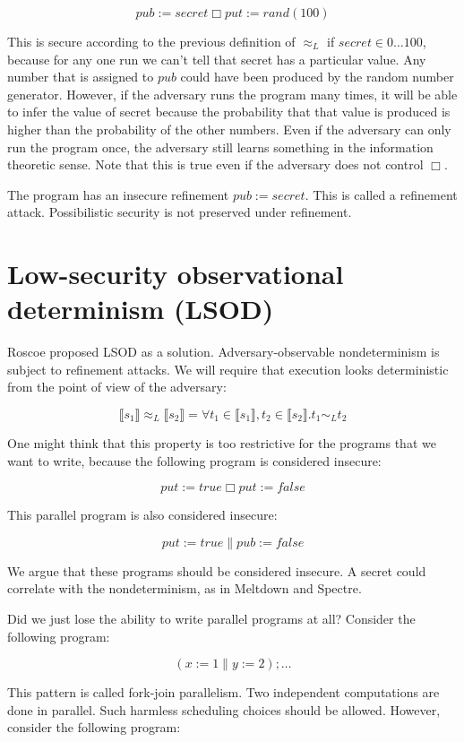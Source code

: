 \documentclass{article}
\begin{document}
\[
pub := secret \Box put := rand(100)
\]

This is secure according to the previous definition of $\approx_L$ if $secret \in {0\dots 100}$, because for any one run we can't tell that secret has a particular value. Any number that is assigned to $pub$ could have been produced by the random number generator. However, if the adversary runs the program many times, it will be able to infer the value of secret because the probability that that value is produced is higher than the probability of the other numbers. Even if the adversary can only run the program once, the adversary still learns something in the information theoretic sense. Note that this is true even if the adversary does not control $\Box$.

The program has an insecure refinement $pub :=  secret$. This is called a refinement attack. Possibilistic security is not preserved under refinement. 

\section*{Low-security observational determinism (LSOD)}

Roscoe \cite{roscoe1995csp} proposed LSOD as a solution. Adversary-observable nondeterminism is subject to refinement attacks. We will require that execution looks deterministic from the point of view of the adversary:

\[
\llbracket s_1 \rrbracket \approx_L \llbracket s_2 \rrbracket = \forall t_1 \in \llbracket s_1 \rrbracket, t_2 \in \llbracket s_2 \rrbracket. t_1 \sim_L t_2
\]

One might think that this property is too restrictive for the programs that we want to write, because the following program is considered insecure:

\[put := true \Box put := false\]

This parallel program is also considered insecure:

\[put := true \parallel pub := false\]

We argue that these programs should be considered insecure. A secret could correlate with the nondeterminism, as in Meltdown and Spectre. 

Did we just lose the ability to write parallel programs at all? Consider the following program:

\[(x := 1 \parallel y := 2); \dots\]

This pattern is called fork-join parallelism. Two independent computations are done in parallel. Such harmless scheduling choices should be allowed. However, consider the following program:
\end{document}
